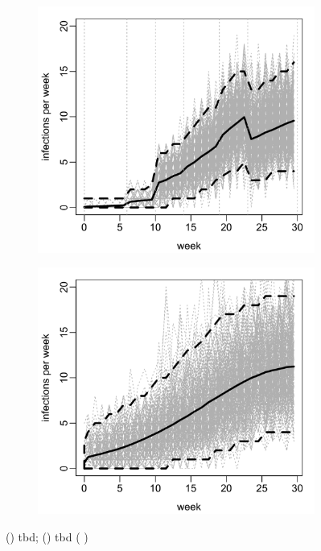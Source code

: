 \documentclass{uwstat572}
\newcommand{\vmcomment}[1]{({\color{blue}{VM's comment:}} \textbf{\color{blue}{#1}})}
\begin{document}
\begin{figure}[H]
	\centering
	\begin{subfigure}[b]{0.49\textwidth}
		\includegraphics[width=\textwidth]{figures/figure_4a.png}
		\caption{}
		\label{fig:cond_infections}
	\end{subfigure}
	\hfill
	\begin{subfigure}[b]{0.49\textwidth}
		\includegraphics[width=\textwidth]{figures/figure_4b.png}
		\caption{}
		\label{fig:sim_infection}
	\end{subfigure}
	\caption{() tbd; () tbd \vmcomment{Don't forget to add informative, self-contained captions everywhere}}
	\label{fig:sim_epidemic}
\end{figure} 
\end{document}
